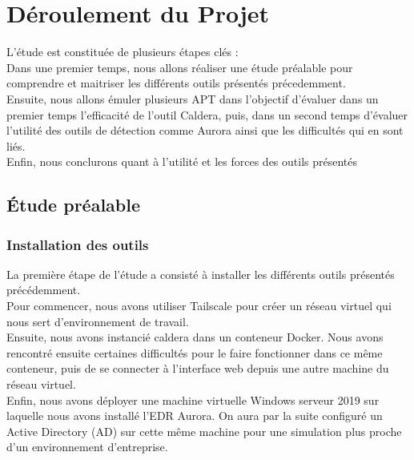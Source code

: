 \documentclass[12pt,letterpaper]{article}
\begin{document}
\section{Déroulement du Projet}

L'étude est constituée de plusieurs étapes clés : \\
Dans une premier temps, nous allons réaliser une étude préalable pour comprendre et maitriser les différents outils présentés précedemment. \\
Ensuite, nous allons émuler plusieurs APT dans l'objectif d'évaluer dans un premier temps l'efficacité de l'outil Caldera, puis, dans un second temps d'évaluer l'utilité des outils de détection comme Aurora ainsi que les difficultés qui en sont liés. \\
Enfin, nous conclurons quant à l'utilité et les forces des outils présentés 

\subsection{Étude préalable}

\subsubsection{Installation des outils}

La première étape de l'étude a consisté à installer les différents outils présentés précédemment. \\

Pour commencer, nous avons utiliser Tailscale pour créer un réseau virtuel qui nous sert d'environnement de travail. \\
Ensuite, nous avons instancié caldera dans un conteneur Docker. Nous avons rencontré ensuite certaines difficultés pour le faire fonctionner dans ce même conteneur, puis de se connecter à l'interface web depuis une autre machine du réseau virtuel. \\
Enfin, nous avons déployer une machine virtuelle Windows serveur 2019 sur laquelle nous avons installé l'EDR Aurora. On aura par la suite configuré un Active Directory (AD) sur cette même machine pour une simulation plus proche d'un environnement d'entreprise.
\end{document}
